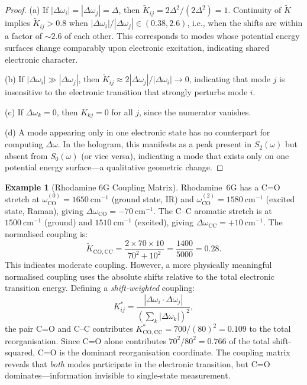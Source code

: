 \documentclass[11pt,a4paper]{article}
\theoremstyle{definition}
\newtheorem{example}[theorem]{Example}
\theoremstyle{remark}
\begin{document}
\begin{proof}
(a) If $|\Delta\omega_i| = |\Delta\omega_j| = \Delta$, then $\tilde{K}_{ij} = 2\Delta^2/(2\Delta^2) = 1$. Continuity of $\tilde{K}$ implies $\tilde{K}_{ij} > 0.8$ when $|\Delta\omega_i|/|\Delta\omega_j| \in (0.38, 2.6)$, i.e., when the shifts are within a factor of $\sim 2.6$ of each other. This corresponds to modes whose potential energy surfaces change comparably upon electronic excitation, indicating shared electronic character.

(b) If $|\Delta\omega_i| \gg |\Delta\omega_j|$, then $\tilde{K}_{ij} \approx 2|\Delta\omega_j|/|\Delta\omega_i| \to 0$, indicating that mode $j$ is insensitive to the electronic transition that strongly perturbs mode $i$.

(c) If $\Delta\omega_k = 0$, then $K_{kj} = 0$ for all $j$, since the numerator vanishes.

(d) A mode appearing only in one electronic state has no counterpart for computing $\Delta\omega$. In the hologram, this manifests as a peak present in $S_2(\omega)$ but absent from $S_0(\omega)$ (or vice versa), indicating a mode that exists only on one potential energy surface---a qualitative geometric change.
\end{proof}

\begin{example}[Rhodamine 6G Coupling Matrix]
\label{ex:rhodamine_coupling}
Rhodamine~6G has a C=O stretch at $\omega^{(0)}_{\mathrm{CO}} = 1650~\mathrm{cm}^{-1}$ (ground state, IR) and $\omega^{(2)}_{\mathrm{CO}} = 1580~\mathrm{cm}^{-1}$ (excited state, Raman), giving $\Delta\omega_{\mathrm{CO}} = -70~\mathrm{cm}^{-1}$. The C--C aromatic stretch is at $1500~\mathrm{cm}^{-1}$ (ground) and $1510~\mathrm{cm}^{-1}$ (excited), giving $\Delta\omega_{\mathrm{CC}} = +10~\mathrm{cm}^{-1}$. The normalised coupling is:
\begin{equation}
\tilde{K}_{\mathrm{CO,CC}} = \frac{2 \times 70 \times 10}{70^2 + 10^2} = \frac{1400}{5000} = 0.28.
\end{equation}
This indicates moderate coupling. However, a more physically meaningful normalised coupling uses the absolute shifts relative to the total electronic transition energy. Defining a \emph{shift-weighted} coupling:
\begin{equation}
K^*_{ij} = \frac{|\Delta\omega_i \cdot \Delta\omega_j|}{(\sum_k |\Delta\omega_k|)^2},
\end{equation}
the pair C=O and C--C contributes $K^*_{\mathrm{CO,CC}} = 700/(80)^2 = 0.109$ to the total reorganisation. Since C=O alone contributes $70^2/80^2 = 0.766$ of the total shift-squared, C=O is the dominant reorganisation coordinate. The coupling matrix reveals that \emph{both} modes participate in the electronic transition, but C=O dominates---information invisible to single-state measurement.
\end{example}
\end{document}
